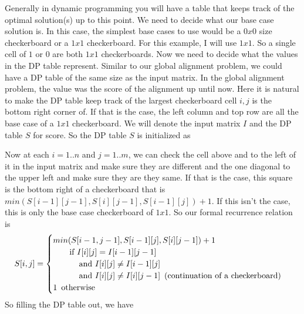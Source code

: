 \documentclass[11pt]{article}
\begin{document}
\noindent
Generally in dynamic programming you will have a table that keeps track of the optimal solution(s) up to this point. We need to decide what our base case solution is. In this case, the simplest base cases to use would be a $0x0$ size checkerboard or a $1x1$ checkerboard. For this example, I will use $1x1$. So a single cell of $1$ or $0$ are both $1x1$ checkerboards. Now we need to decide what the values in the DP table represent. Similar to our global alignment problem, we could have a DP table of the same size as the input matrix. In the global alignment problem, the value was the score of the alignment up until now. Here it is natural to make the DP table keep track of the largest checkerboard cell $i,j$ is the bottom right corner of. If that is the case, the left column and top row are all the base case of a $1x1$ checkerboard. We will denote the input matrix $I$ and the DP table $S$ for score. So the DP table $S$ is initialized as
\noindent
{}

\noindent
Now at each $i=1..n$ and $j=1..m$, we can check the cell above and to the left of it in the input matrix and make sure they are different and the one diagonal to the upper left and make sure they are they same. If that is the case, this square is the bottom right of a checkerboard that is $min(S[i-1][j-1], S[i][j-1], S[i-1][j]) + 1$. If this isn't the case, this is only the base case checkerboard of $1x1$. So our formal recurrence relation is
\begin{equation*}
S[i,j] = 
\begin{cases}
      min(S[i-1,j-1], S[i-1][j], S[i][j-1]) + 1\\ 
      \text{\,\,\,\,\,\,\,\,\,\,\,\,if\,\,} I[i][j] = I[i-1][j-1]  \\
      \text{\,\,\,\,\,\,\,\,\,\,\,\,\,\,\,\,\,\,\,and\,\,} I[i][j] \neq I[i-1][j] \\
      \text{\,\,\,\,\,\,\,\,\,\,\,\,\,\,\,\,\,\,\,and\,\,} I[i][j] \neq I[i][j-1] \text{\,\,\,(continuation of a checkerboard)} \\
      1 \text{\,\,\,otherwise} \\
\end{cases}
\end{equation*}
So filling the DP table out, we have 
\end{document}

